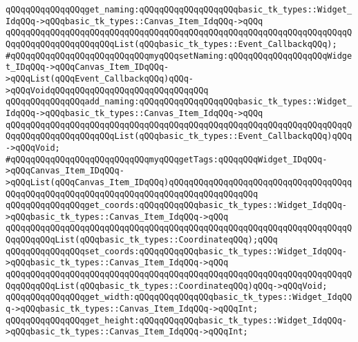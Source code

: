 \newline
\verb|qQQqqQQqqQQqqQQqget_naming:qQQqqQQqqQQqqQQqqQQqbasic_tk_types::Widget_IdqQQq->qQQqbasic_tk_types::Canvas_Item_IdqQQq->qQQq|\newline
\verb|qQQqqQQqqQQqqQQqqQQqqQQqqQQqqQQqqQQqqQQqqQQqqQQqqQQqqQQqqQQqqQQqqQQqqQQqqQQqqQQqqQQqqQQqqQQqList(qQQqbasic_tk_types::Event_CallbackqQQq);|\newline
\verb|#qQQqqQQqqQQqqQQqqQQqqQQqqQQqmyqQQqsetNaming:qQQqqQQqqQQqqQQqqQQqWidget_IDqQQq->qQQqCanvas_Item_IDqQQq->qQQqList(qQQqEvent_CallbackqQQq)qQQq->qQQqVoidqQQqqQQqqQQqqQQqqQQqqQQqqQQqqQQq|\newline
\verb|qQQqqQQqqQQqqQQqadd_naming:qQQqqQQqqQQqqQQqqQQqbasic_tk_types::Widget_IdqQQq->qQQqbasic_tk_types::Canvas_Item_IdqQQq->qQQq|\newline
\verb|qQQqqQQqqQQqqQQqqQQqqQQqqQQqqQQqqQQqqQQqqQQqqQQqqQQqqQQqqQQqqQQqqQQqqQQqqQQqqQQqqQQqqQQqqQQqList(qQQqbasic_tk_types::Event_CallbackqQQq)qQQq->qQQqVoid;|\newline
\newline
\verb|#qQQqqQQqqQQqqQQqqQQqqQQqqQQqmyqQQqgetTags:qQQqqQQqWidget_IDqQQq->qQQqCanvas_Item_IDqQQq->qQQqList(qQQqCanvas_Item_IDqQQq)qQQqqQQqqQQqqQQqqQQqqQQqqQQqqQQqqQQqqQQqqQQqqQQqqQQqqQQqqQQqqQQqqQQqqQQqqQQqqQQqqQQqqQQq|\newline
\newline
\newline
\verb|qQQqqQQqqQQqqQQqget_coords:qQQqqQQqqQQqbasic_tk_types::Widget_IdqQQq->qQQqbasic_tk_types::Canvas_Item_IdqQQq->qQQq|\newline
\verb|qQQqqQQqqQQqqQQqqQQqqQQqqQQqqQQqqQQqqQQqqQQqqQQqqQQqqQQqqQQqqQQqqQQqqQQqqQQqqQQqList(qQQqbasic_tk_types::CoordinateqQQq);qQQq|\newline
\verb|qQQqqQQqqQQqqQQqset_coords:qQQqqQQqqQQqbasic_tk_types::Widget_IdqQQq->qQQqbasic_tk_types::Canvas_Item_IdqQQq->qQQq|\newline
\verb|qQQqqQQqqQQqqQQqqQQqqQQqqQQqqQQqqQQqqQQqqQQqqQQqqQQqqQQqqQQqqQQqqQQqqQQqqQQqqQQqList(qQQqbasic_tk_types::CoordinateqQQq)qQQq->qQQqVoid;|\newline
\newline
\verb|qQQqqQQqqQQqqQQqget_width:qQQqqQQqqQQqqQQqbasic_tk_types::Widget_IdqQQq->qQQqbasic_tk_types::Canvas_Item_IdqQQq->qQQqInt;|\newline
\verb|qQQqqQQqqQQqqQQqget_height:qQQqqQQqqQQqbasic_tk_types::Widget_IdqQQq->qQQqbasic_tk_types::Canvas_Item_IdqQQq->qQQqInt;|\newline
\newline
